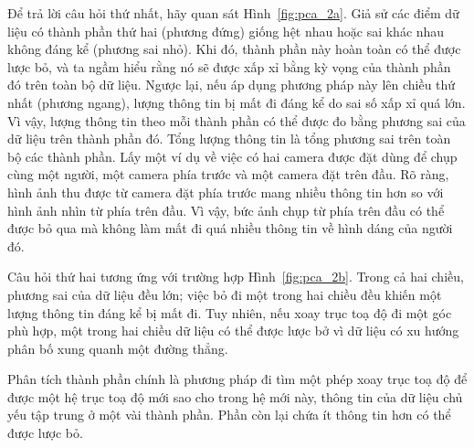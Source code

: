 \documentclass[12pt,a4paper,oneside]{report}
\numberwithin{equation}{section}
\def\R{\mathbb{R}}
\begin{document}
%
Để trả lời câu hỏi thứ nhất, hãy quan sát Hình~\ref{fig:pca_2a}. Giả sử các
điểm dữ liệu có thành phần thứ hai (phương đứng) giống hệt nhau hoặc sai khác
nhau không đáng kể (phương sai nhỏ). Khi đó, thành phần này hoàn toàn có thể được lược
bỏ, và ta ngầm hiểu rằng nó sẽ được xấp xỉ bằng kỳ vọng của thành phần đó
trên toàn bộ dữ liệu. Ngược lại, nếu áp dụng phương pháp này lên chiều thứ nhất (phương ngang), {lượng thông tin} bị mất đi đáng kể do sai số xấp xỉ quá lớn. Vì vậy, lượng thông tin theo mỗi thành phần có thể được đo bằng phương sai của dữ liệu trên thành phần đó. Tổng lượng
thông tin là tổng phương sai trên toàn bộ các thành phần. Lấy
một ví dụ về việc có hai camera được đặt dùng để chụp cùng một người, một camera
phía trước và một camera đặt trên đầu. Rõ ràng, hình ảnh thu được từ
camera đặt phía trước mang nhiều thông tin hơn so với hình ảnh nhìn từ
phía trên đầu. Vì vậy, bức ảnh chụp từ phía trên đầu có thể được bỏ qua mà không
làm mất đi quá nhiều thông tin về hình dáng của người đó.

Câu hỏi thứ hai tương ứng với trường hợp Hình~\ref{fig:pca_2b}. Trong cả hai
chiều, phương sai của dữ liệu đều lớn; việc bỏ đi một trong hai chiều đều khiến
một lượng thông tin đáng kể bị mất đi. Tuy nhiên, nếu xoay trục toạ độ đi một
góc phù hợp, một trong hai chiều dữ liệu có thể được lược bở vì dữ liệu có xu
hướng phân bố xung quanh một đường thẳng.

Phân tích thành phần chính là phương pháp đi tìm một phép xoay trục toạ độ để được một hệ trục toạ độ mới sao cho trong hệ mới này, thông tin của dữ liệu chủ yếu tập trung ở một vài thành phần. Phần còn lại chứa ít thông tin hơn có thể được lược bỏ.
\end{document}
